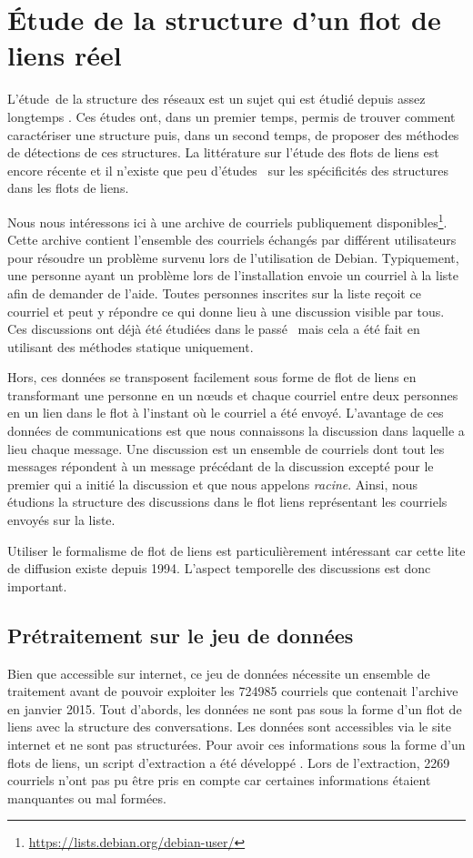 

\chapter{Étude de la structure d'un flot de liens réel}

L'étude\ de la structure des réseaux est un sujet qui est étudié depuis assez longtemps \REF.
Ces études ont, dans un premier temps, permis de trouver comment caractériser une structure puis, dans un second temps, de proposer des méthodes de détections de ces structures.
La littérature sur l'étude des flots de liens est encore récente et il n'existe que peu d'études \REF\ sur les spécificités des structures dans les flots de liens.

Nous nous intéressons ici à une archive de courriels publiquement disponibles\footnote{\url{https://lists.debian.org/debian-user/}}.
Cette archive contient l'ensemble des courriels échangés par différent utilisateurs pour résoudre un problème survenu lors de l'utilisation de Debian.
Typiquement, une personne ayant un problème lors de l'installation envoie un courriel à la liste afin de demander de l'aide.
Toutes personnes inscrites sur la liste reçoit ce courriel et peut y répondre ce qui donne lieu à une discussion visible par tous.
Ces discussions ont déjà été étudiées dans le passé~\cite{Dorat2007} mais cela a été fait en utilisant des méthodes statique uniquement.

Hors, ces données se transposent facilement sous forme de flot de liens en transformant une personne en un n\oe uds et chaque courriel entre deux personnes en un lien dans le flot à l'instant où le courriel a été envoyé.
L'avantage de ces données de communications est que nous connaissons la discussion dans laquelle a lieu chaque message.
Une discussion est un ensemble de courriels dont tout les messages répondent à un message précédant de la discussion excepté pour le premier qui a initié la discussion et que nous appelons \emph{racine}.
Ainsi, nous étudions la structure des discussions dans le flot liens représentant les courriels envoyés sur la liste.

Utiliser le formalisme de flot de liens est particulièrement intéressant car cette lite de diffusion existe depuis 1994.
L'aspect temporelle des discussions est donc important.



\section{Prétraitement sur le jeu de données}
Bien que accessible sur internet, ce jeu de données nécessite un ensemble de traitement avant de pouvoir exploiter les 724985 courriels que contenait l'archive en janvier 2015.
Tout d'abords, les données ne sont pas sous la forme d'un flot de liens avec la structure des conversations.
Les données sont accessibles via le site internet et ne sont pas structurées.
Pour avoir ces informations sous la forme d'un flots de liens, un script d'extraction a été développé .
Lors de l'extraction, 2269 courriels n'ont pas pu être pris en compte car certaines informations étaient manquantes ou mal formées.

